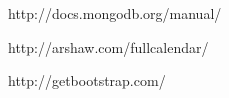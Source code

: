\documentclass[twocolumn]{article}
\begin{document}
%
%
\begin{thebibliography}{9}


http://docs.mongodb.org/manual/

http://arshaw.com/fullcalendar/

 http://getbootstrap.com/


\end{thebibliography}
\end{document}

